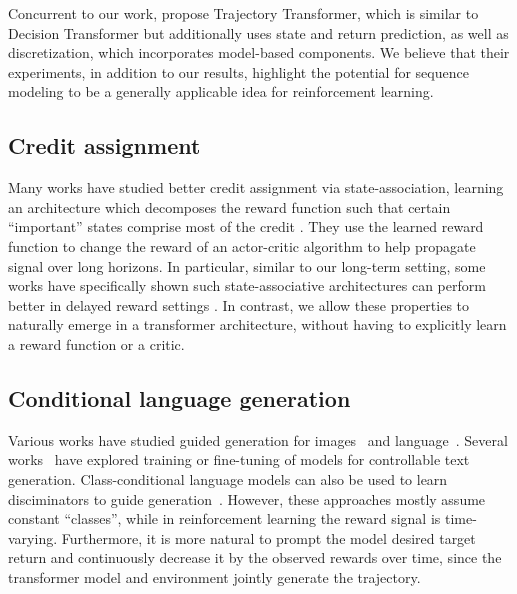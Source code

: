 Concurrent to our work, \citet{janner2021tto} propose Trajectory Transformer, which is similar to Decision Transformer but additionally uses state and return prediction, as well as discretization, which incorporates model-based components.
We believe that their experiments, in addition to our results, highlight the potential for sequence modeling to be a generally applicable idea for reinforcement learning.

\subsection{Credit assignment}

Many works have studied better credit assignment via state-association, learning an architecture which decomposes the reward function such that certain ``important'' states comprise most of the credit \citep{ferret2019self, harutyunyan2019hindsight,  mesnard2020counterfactual}.
They use the learned reward function to change the reward of an actor-critic algorithm to help propagate signal over long horizons.
In particular, similar to our long-term setting, some works have specifically shown such state-associative architectures can perform better in delayed reward settings \citep{arjona2018rudder, hung2019optimizing, liu2019sequence, raposo2021synthetic}.
In contrast, we allow these properties to naturally emerge in a transformer architecture, without having to explicitly learn a reward function or a critic.

\subsection{Conditional language generation}

Various works have studied guided generation for images~\citep{karras2019stylegan} and language~\citep{ghazvininejad2017hafez, weng2021conditional}. Several works~\citep{ficler2017controlling, hu2017toward, rajani2019explain, yu2016sequence,ziegler2019fine, keskar2019ctrl} have explored training or fine-tuning of models for controllable text generation.
Class-conditional language models can also be used to learn disciminators to guide generation~\citep{dathathri2019plug, ghazvininejad2017hafez, holtzman2018learning,  krause2020gedi}.
However, these approaches mostly assume constant ``classes'', while in reinforcement learning the reward signal is time-varying.
Furthermore, it is more natural to prompt the model desired target return and continuously decrease it by the observed rewards over time, since the transformer model and environment jointly generate the trajectory.

